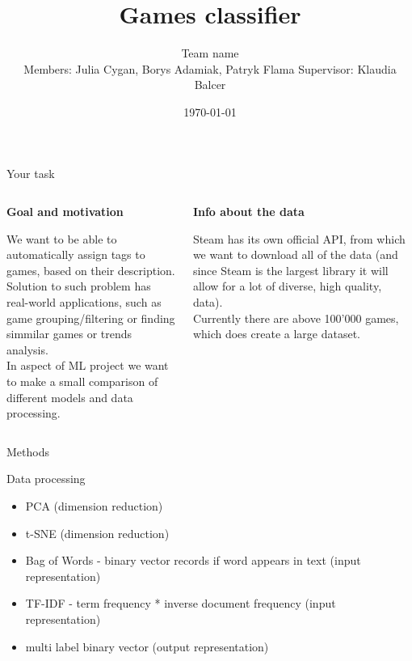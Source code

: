 \documentclass{beamer}
\title{Games classifier}
\author[Team name]{Team name\\[5mm]
{\small Members: Julia Cygan, Borys Adamiak, Patryk Flama}
\hspace{18mm} 
{\small Supervisor: Klaudia Balcer}}
\institute{UWr}
\date{\today}
\begin{document}
\begin{frame}
\titlepage
\end{frame}


\begin{frame}[t]{Your task}

\begin{columns}
\begin{column}[t]{0.5\textwidth}

{\bf Goal and motivation}

We want to be able to automatically assign tags to games, based on their description. \\
Solution to such problem has real-world applications, such as game grouping/filtering or finding simmilar games or trends analysis. \\
In aspect of ML project we want to make a small comparison of different models and data processing.

\end{column}

\pause

\begin{column}[t]{0.5\textwidth}

{\bf Info about the data}

Steam has its own official API, from which we want to download all of the data (and since Steam is the largest library it will allow for a lot of diverse, high quality, data). \\
Currently there are above 100'000 games, which does create a large dataset.

\end{column}
\end{columns}

\end{frame}


\begin{frame}[t]{Methods}

Data processing

\begin{itemize}
\item PCA (dimension reduction)
\item t-SNE (dimension reduction)
\item Bag of Words - binary vector records if word appears in text (input representation)
\item TF-IDF - term frequency * inverse document frequency (input representation)
\item multi label binary vector (output representation)
\end{itemize}
\end{frame}
\end{document}
